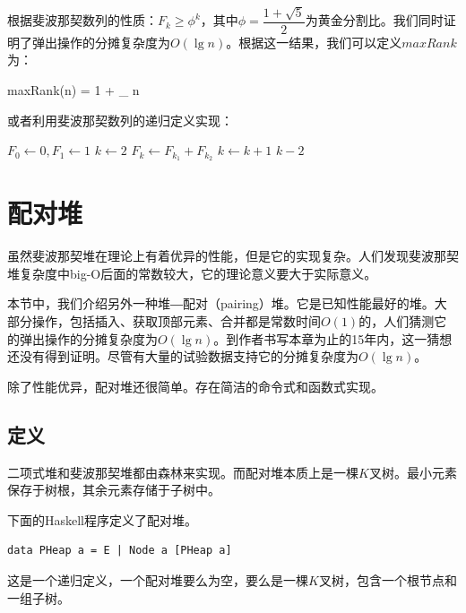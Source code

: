\documentclass[b5paper]{ctexart}
\begin{document}
根据斐波那契数列的性质：$F_k \geq \phi^k$，其中$\phi = \dfrac{1+\sqrt{5}}{2}$为黄金分割比。我们同时证明了弹出操作的分摊复杂度为$O(\lg n)$。根据这一结果，我们可以定义$maxRank$为：

\be
  maxRank(n) = 1 + \lfloor \log_{\phi} n \rfloor
\ee

或者利用斐波那契数列的递归定义实现：

\begin{algorithmic}[1]
  \State $F_0 \gets 0, F_1 \gets 1$
  \State $k \gets 2$
  \Repeat
    \State $F_k \gets F_{k_1} + F_{k_2}$
    \State $k \gets k + 1$
  \State \Return $k - 2$
\EndFunction
\end{algorithmic}

\section{配对堆}
\label{pairing-heap} 

虽然斐波那契堆在理论上有着优异的性能，但是它的实现复杂。人们发现斐波那契堆复杂度中big-O后面的常数较大，它的理论意义要大于实际意义。

本节中，我们介绍另外一种堆―配对（pairing）堆。它是已知性能最好的堆。大部分操作，包括插入、获取顶部元素、合并都是常数时间$O(1)$的，人们猜测它的弹出操作的分摊复杂度为$O(\lg n)$\cite{pairing-heap}\cite{okasaki-book}。到作者书写本章为止的15年内，这一猜想还没有得到证明。尽管有大量的试验数据支持它的分摊复杂度为$O(\lg n)$。

除了性能优异，配对堆还很简单。存在简洁的命令式和函数式实现。

\subsection{定义}

二项式堆和斐波那契堆都由森林来实现。而配对堆本质上是一棵$K$叉树。最小元素保存于树根，其余元素存储于子树中。

下面的Haskell程序定义了配对堆。

\lstset{language=Haskell}
\begin{lstlisting}[style=Haskell]
data PHeap a = E | Node a [PHeap a]
\end{lstlisting}

这是一个递归定义，一个配对堆要么为空，要么是一棵$K$叉树，包含一个根节点和一组子树。
\end{document}
